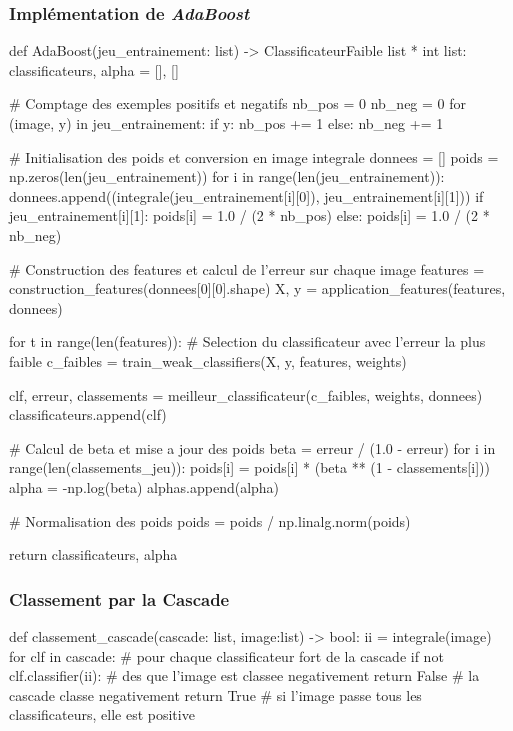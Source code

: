 \documentclass[12pt,a4paper]{article}
\begin{document}
\subsubsection{Implémentation de \textit{AdaBoost}} \label{sec:impl-adaboost}
\begin{python}
def AdaBoost(jeu_entrainement: list) -> ClassificateurFaible list * int list:    
    classificateurs, alpha = [], []

    # Comptage des exemples positifs et negatifs
    nb_pos = 0
    nb_neg = 0
    for (image, y) in jeu_entrainement:
        if y:
            nb_pos += 1
        else:
            nb_neg += 1
    
    # Initialisation des poids et conversion en image integrale
    donnees = []
    poids = np.zeros(len(jeu_entrainement))
    for i in range(len(jeu_entrainement)):
        donnees.append((integrale(jeu_entrainement[i][0]), jeu_entrainement[i][1]))
        if jeu_entrainement[i][1]:
            poids[i] = 1.0 / (2 * nb_pos)
        else:
            poids[i] = 1.0 / (2 * nb_neg)

    # Construction des features et calcul de l'erreur sur chaque image
    features = construction_features(donnees[0][0].shape)
    X, y = application_features(features, donnees)

    for t in range(len(features)):
        # Selection du classificateur avec l'erreur la plus faible
        c_faibles = train_weak_classifiers(X, y, features, weights)

        clf, erreur, classements = meilleur_classificateur(c_faibles, weights, donnees)
        classificateurs.append(clf)

        # Calcul de beta et mise a jour des poids
        beta = erreur / (1.0 - erreur)
        for i in range(len(classements_jeu)):
            poids[i] = poids[i] * (beta ** (1 - classements[i]))
        alpha = -np.log(beta)
        alphas.append(alpha)

        # Normalisation des poids
        poids = poids / np.linalg.norm(poids)

    return classificateurs, alpha
\end{python}

\subsubsection{Classement par la Cascade} \label{sec:code-cascade}
\begin{python}
def classement_cascade(cascade: list, image:list) -> bool:
    ii = integrale(image)
    for clf in cascade: # pour chaque classificateur fort de la cascade
        if not clf.classifier(ii): # des que l'image est classee negativement
            return False # la cascade classe negativement
    return True # si l'image passe tous les classificateurs, elle est positive
\end{python}
\end{document}
